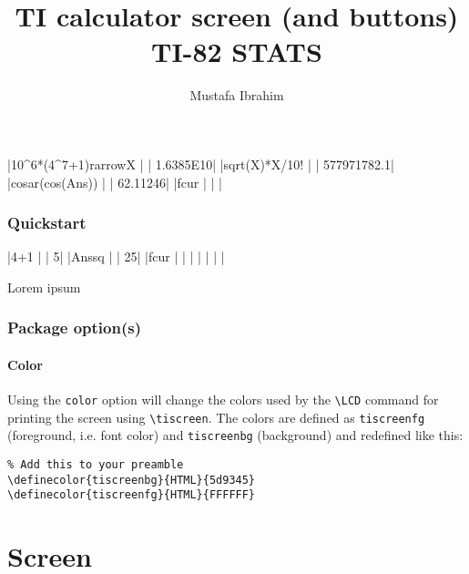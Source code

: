 \documentclass[a4paper,12pt]{article}
\title{TI calculator screen (and buttons)\\{\small TI-82 STATS}}
\author{Mustafa Ibrahim}
\newcommand{\printcmd}[1]{\texttt{\textbackslash #1}}
\begin{document}
\maketitle

\begin{center}
\tiscreen
|10^6*(4^7+1){rarrow}X  |
|       1.6385E10|
|{sqrt}(X)*X/10!      |
|     577971782.1|
|cos{ar}(cos(Ans))  |
|        62.11246|
|{fcur}               |
|                |

\tibtnmatrixextra
\end{center}

\tableofcontents\newpage

\section{Quickstart}

\begin{SideBySideExample}[xrightmargin=5.5cm]

\tiscreen
|4+1             |
|               5|
|Ans{sq}         |
|              25|
|{fcur}          |
|                |
|                |
|                |

\tibtnmatrixextra

Lorem
ipsum

\end{SideBySideExample}

\section{Package option(s)}
\subsection{Color}

Using the \texttt{color} option will change the colors used by the
\printcmd{LCD} command for printing the screen using \printcmd{tiscreen}. The
colors are defined as \texttt{tiscreenfg} (foreground, i.e. font color) and
\texttt{tiscreenbg} (background) and redefined like this:

\begin{Verbatim}
% Add this to your preamble
\definecolor{tiscreenbg}{HTML}{5d9345}
\definecolor{tiscreenfg}{HTML}{FFFFFF}
\end{Verbatim}

\part{Screen}
\end{document}
